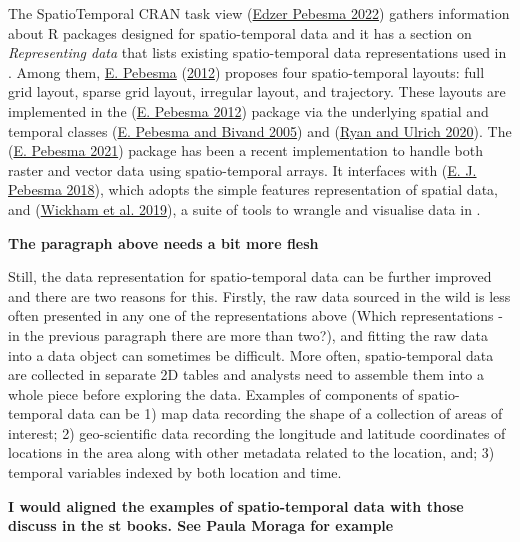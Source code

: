 \documentclass{article}
\begin{document}
The SpatioTemporal CRAN task view (\protect\hyperlink{ref-ctvspatiotemporal}{Edzer Pebesma 2022}) gathers information about R packages designed for spatio-temporal data and it has a section on \emph{Representing data} that lists existing spatio-temporal data representations used in . Among them, \protect\hyperlink{ref-spacetime}{E. Pebesma} (\protect\hyperlink{ref-spacetime}{2012}) proposes four spatio-temporal layouts: full grid layout, sparse grid layout, irregular layout, and trajectory. These layouts are implemented in the  (\protect\hyperlink{ref-spacetime}{E. Pebesma 2012}) package via the underlying spatial and temporal classes  (\protect\hyperlink{ref-sp}{E. Pebesma and Bivand 2005}) and  (\protect\hyperlink{ref-xts}{Ryan and Ulrich 2020}). The  (\protect\hyperlink{ref-stars}{E. Pebesma 2021}) package has been a recent implementation to handle both raster and vector data using spatio-temporal arrays. It interfaces with  (\protect\hyperlink{ref-sf}{E. J. Pebesma 2018}), which adopts the simple features representation of spatial data, and  (\protect\hyperlink{ref-tidyverse}{Wickham et al. 2019}), a suite of tools to wrangle and visualise data in .

\textbf{The paragraph above needs a bit more flesh}

Still, the data representation for spatio-temporal data can be further improved and there are two reasons for this. Firstly, the raw data sourced in the wild is less often presented in any one of the representations above (Which representations - in the previous paragraph there are more than two?), and fitting the raw data into a data object can sometimes be difficult. More often, spatio-temporal data are collected in separate 2D tables and analysts need to assemble them into a whole piece before exploring the data. Examples of components of spatio-temporal data can be 1) map data recording the shape of a collection of areas of interest; 2) geo-scientific data recording the longitude and latitude coordinates of locations in the area along with other metadata related to the location, and; 3) temporal variables indexed by both location and time.

\textbf{I would aligned the examples of spatio-temporal data with those discuss in the st books. See Paula Moraga for example}
\end{document}
